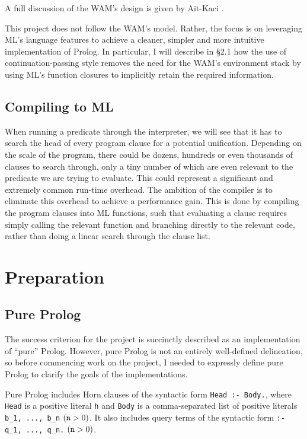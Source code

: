 \documentclass[12pt]{article}
\begin{document}
A full discussion of the WAM's design is given by A\"it-Kaci \cite{wam91}.

This project does not follow the WAM's model. 
Rather, the focus is on leveraging ML's language features to achieve a cleaner, simpler and more intuitive implementation of Prolog. 
In particular, I will describe in \S2.1 how the use of continuation-passing style removes the need for the WAM's environment stack by using ML's function closures to implicitly retain the required information.

\subsection{Compiling to ML}

When running a predicate through the interpreter, we will see that it has to search the head of every program clause for a potential unification. 
Depending on the scale of the program, there could be dozens, hundreds or even thousands of clauses to search through, only a tiny number of which are even relevant to the predicate we are trying to evaluate.
This could represent a significant and extremely common run-time overhead. 
The ambition of the compiler is to eliminate this overhead to achieve a performance gain. 
This is done by compiling the program clauses into ML functions, such that evaluating a clause requires simply calling the relevant function and branching directly to the relevant code, rather than doing a linear search through the clause list.

\newpage

\section{Preparation}


\subsection{Pure Prolog}

The success criterion for the project is succinctly described as an implementation of ``pure'' Prolog. 
However, pure Prolog is not an entirely well-defined delineation, so before commencing work on the project, I needed to expressly define pure Prolog to clarify the goals of the implementations.

Pure Prolog includes Horn clauses of the syntactic form \verb|Head :- Body.|, where \verb|Head| is a positive literal \verb|h| and \verb|Body| is a comma-separated list of positive literals \verb|b_1, ..., b_n| $(\verb|n| > 0)$. 
It also includes query terms of the syntactic form \verb|:- q_1, ..., q_n.| $(\verb|n| > 0)$.
\end{document}
